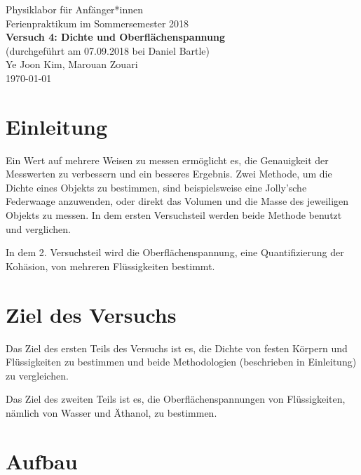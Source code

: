 \documentclass[11pt,a4paper]{article} %
\begin{document}
{
	\centering 
	\large 
	Physiklabor für Anfänger*innen \\
	Ferienpraktikum im Sommersemester 2018 \\[4mm]
	\textbf{\LARGE 
		Versuch 4: Dichte und Oberflächenspannung
	} \\[3mm]
	(durchgeführt am 07.09.2018 bei Daniel Bartle) \\
	Ye Joon Kim, Marouan Zouari\\
	\today \\[10mm]
}


\section{Einleitung}
Ein Wert auf mehrere Weisen zu messen ermöglicht es, die Genauigkeit der Messwerten zu verbessern und ein besseres Ergebnis. Zwei Methode, um die Dichte eines Objekts zu bestimmen, sind beispielsweise eine Jolly'sche Federwaage anzuwenden, oder direkt das Volumen und die Masse des jeweiligen Objekts zu messen. In dem ersten Versuchsteil werden beide Methode benutzt und verglichen. 

In dem 2. Versuchsteil wird die Oberflächenspannung, eine Quantifizierung der Kohäsion, von mehreren Flüssigkeiten bestimmt. 
\section{Ziel des Versuchs}
Das Ziel des ersten Teils des Versuchs ist es, die Dichte von festen Körpern und Flüssigkeiten zu bestimmen und beide Methodologien (beschrieben in Einleitung) zu vergleichen.

 Das Ziel des zweiten Teils ist es, die Oberflächenspannungen von Flüssigkeiten, nämlich von Wasser und Äthanol, zu bestimmen. 

\section{Aufbau}
\end{document}
